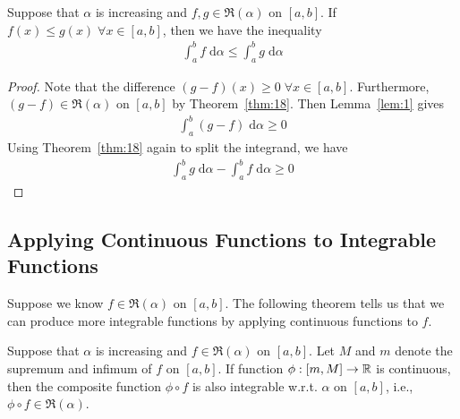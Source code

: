 \documentclass[thmcnt=section, 12pt]{my-elegantbook}
\begin{document}
\begin{theorem} \label{thm:30}
    Suppose that $\alpha$ is increasing and $f, g \in \mathfrak{R}(\alpha)$ on $[a, b]$. If $f(x) \leq g(x) \; \forall x \in [a, b]$, then we have the inequality
    \begin{align*}
        \int_{a}^{b} f \; \mathrm{d}\alpha
        \leq \int_{a}^{b} g \; \mathrm{d}\alpha
    \end{align*}
\end{theorem}

\begin{proof}
    Note that the difference $(g-f)(x) \geq 0 \; \forall x \in [a, b]$. Furthermore, $(g-f) \in \mathfrak{R}(\alpha)$ on $[a, b]$ by Theorem~\ref{thm:18}. Then Lemma~\ref{lem:1} gives
    \begin{align*}
        \int_{a}^{b} (g-f) \; \mathrm{d}\alpha \geq 0
    \end{align*}
    Using Theorem~\ref{thm:18} again to split the integrand, we have
    \begin{align*}
        \int_{a}^{b} g \; \mathrm{d}\alpha
        - \int_{a}^{b} f \; \mathrm{d}\alpha
        \geq 0
    \end{align*}
\end{proof}


\subsection{Applying Continuous Functions to Integrable Functions}

Suppose we know $f \in \mathfrak{R}(\alpha)$ on $[a, b]$. The following theorem tells us that we can produce more integrable functions by applying continuous functions to $f$.

\begin{theorem} \label{thm:29}
    Suppose that $\alpha$ is increasing and $f \in \mathfrak{R}(\alpha)$ on $[a, b]$. Let $M$ and $m$ denote the supremum and infimum of $f$ on $[a, b]$. If function $\phi: [m, M] \to \mathbb{R}$ is continuous, then the composite function $\phi \circ f$ is also integrable w.r.t. $\alpha$ on $[a, b]$, i.e., $\phi \circ f \in \mathfrak{R}(\alpha)$.
\end{theorem}
\end{document}
